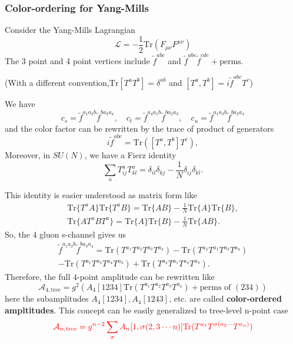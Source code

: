 \documentclass{beamer}
\begin{document}
\begin{frame}
    \frametitle{Color-ordering for Yang-Mills}
    Consider the Yang-Mills Lagrangian
    \begin{equation*}
        \mathcal{L}=-\frac{1}{2}\mathrm{Tr}(F_{\mu\nu}F^{\mu\nu})
    \end{equation*}
    The 3 point and 4 point vertices include $\tilde{f}^{abc}$ and $\tilde{f}^{abe}\tilde{f}^{cde}+\text{perms}$.

    (With a different convention,$\textrm{Tr}[T^aT^b]=\delta^{ab}$ and $[T^a,T^b]=i\tilde{f}^{abc}T^c$)

    We have 
    \begin{equation*}
        c_s=\tilde{f}^{a_1a_2b}\tilde{f}^{ba_3a_4},\quad c_t=\tilde{f}^{a_4a_1b}\tilde{f}^{ba_2a_3},\quad c_u=\tilde{f}^{a_1a_3b}\tilde{f}^{ba_2a_4}
    \end{equation*}
    and the color factor can be rewritten by the trace of product of generators
    \begin{equation*}
        i\tilde{f}^{abc}=\mathrm{Tr}([T^a,T^b]T^c),
    \end{equation*}
    Moreover, in $SU(N)$, we have a Fierz identity
    \begin{equation}
        \sum_{a}T^a_{ij}T^a_{kl}=\delta_{il}\delta_{kj}-\frac{1}{N}\delta_{ij}\delta_{kl}.
    \end{equation}
\end{frame}
    
\begin{frame}
    This identity is easier understood as matrix form like 
    \begin{align*}
    \mathrm{Tr}\{T^aA\}\mathrm{Tr}\{T^aB\}=\mathrm{Tr}\{AB\}-\frac{1}{N}\mathrm{Tr}\{A\}\mathrm{Tr}\{B\},\\
    \mathrm{Tr}\{AT^aBT^a\}=\mathrm{Tr}\{A\}\mathrm{Tr}\{B\}-\frac{1}{N}\mathrm{Tr}\{AB\}.
    \end{align*}
    So, the 4 gluon s-channel gives us
    \begin{align*}
        \tilde{f}^{a_1a_2b}\tilde{f}^{ba_3a_4}=\mathrm{Tr}(T^{a_1}T^{a_2}T^{a_3}T^{a_4})-\mathrm{Tr}(T^{a_2}T^{a_1}T^{a_3}T^{a_4})\\
        -\mathrm{Tr}(T^{a_1}T^{a_2}T^{a_4}T^{a_3})+\mathrm{Tr}(T^{a_2}T^{a_1}T^{a_4}T^{a_3}).
    \end{align*}
    Therefore, the full 4-point amplitude can be rewritten like
    \begin{equation*}
        \mathcal{A}_{4,\text{tree}}=g^2(A_4[1234]\mathrm{Tr}(T^{a_1}T^{a_2}T^{a_3}T^{a_4})+\text{perms of } (234) )
    \end{equation*}
    here the subamplitudes $A_4[1234],A_4[1243]$, etc. are called \textbf{color-ordered ampltitudes}. This concept can be easily generalized to tree-level n-point case
    \begin{equation*}
        \textcolor{red}{\mathcal{A}_{n,\text{tree}}=g^{n-2}\sum_{\sigma}A_n[1,\sigma(2,3\cdots n)]\mathrm{Tr}(T^{a_1}T^{\sigma(a_2\cdots}T^{a_n)})}
    \end{equation*}
\end{frame}
\end{document}

